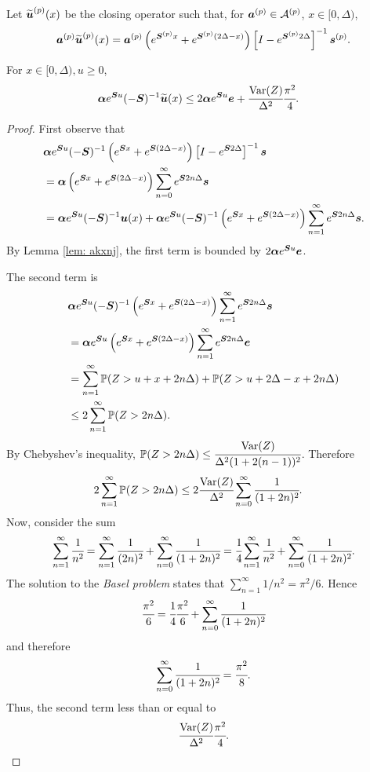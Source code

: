 Let \(\widetilde{\boldsymbol u}^{(p)}(x)\) be the closing operator such that, for \(\boldsymbol a^{(p)} \in\mathcal A^{(p)}\), \(x\in[0,\Delta)\),
\[\boldsymbol a^{(p)} \widetilde{\boldsymbol u}^{(p)}(x) = \boldsymbol a^{(p)} \left(e^{\boldsymbol{S}^{(p)}x} + e^{\boldsymbol{S}^{(p)}(2\Delta-x)}\right)\left[I-e^{\boldsymbol S^{(p)} 2\Delta}\right]^{-1}\boldsymbol s^{(p)}.\]
\begin{lem}\label{lem: akxnj2}
	For \(x\in[0,\Delta),u\geq 0\),  
        \begin{align*}
        		\boldsymbol \alpha   e^{\boldsymbol Su}(-\boldsymbol S)^{-1} \widetilde{\boldsymbol u}(x) &\leq 2 \boldsymbol \alpha e^{\boldsymbol Su} \boldsymbol e + \cfrac{\mathrm{Var}(Z)}{\Delta^2}\cfrac{\pi^2}{4}.
	\end{align*}
\end{lem}
\begin{proof}
	First observe that 
	\begin{align*}
		&\boldsymbol \alpha e^{\boldsymbol Su}(-\boldsymbol S)^{-1} \left(e^{\boldsymbol{S} x} + e^{\boldsymbol{S} (2\Delta-x)}\right)\left[I-e^{\boldsymbol S  2\Delta}\right]^{-1}\boldsymbol s 
		\\ &=\boldsymbol \alpha \left(e^{\boldsymbol{S} x} + e^{\boldsymbol{S} (2\Delta-x)}\right)\sum_{n=0}^\infty e^{\boldsymbol S  2n\Delta} \boldsymbol s 
		\\ &=\boldsymbol \alpha e^{\boldsymbol Su}(-\boldsymbol S)^{-1} \boldsymbol u(x) + \boldsymbol \alpha e^{\boldsymbol Su}(-\boldsymbol S)^{-1} \left(e^{\boldsymbol{S} x} + e^{\boldsymbol{S} (2\Delta-x)}\right)\sum_{n=1}^\infty e^{\boldsymbol S  2n\Delta} \boldsymbol s.
	\end{align*}
	By Lemma \ref{lem: akxnj}, the first term is bounded by \(2\boldsymbol \alpha e^{\boldsymbol S u}\boldsymbol e\). 
	
	The second term is 
	\begin{align*}
		&\boldsymbol \alpha e^{\boldsymbol Su}(-\boldsymbol S)^{-1} \left(e^{\boldsymbol{S} x} + e^{\boldsymbol{S} (2\Delta-x)}\right)\sum_{n=1}^\infty e^{\boldsymbol S  2n\Delta} \boldsymbol s
		\\&= \boldsymbol \alpha e^{\boldsymbol Su} \left(e^{\boldsymbol{S} x} + e^{\boldsymbol{S} (2\Delta-x)}\right)\sum_{n=1}^\infty e^{\boldsymbol S  2n\Delta} \boldsymbol e
		\\&=\sum_{n=1}^\infty \mathbb P(Z>u+x+2n\Delta) + \mathbb P(Z>u+2\Delta-x+2n\Delta)
		\\&\leq 2 \sum_{n=1}^\infty \mathbb P(Z>2n\Delta).
	\end{align*}
	By Chebyshev's inequality, \(\mathbb P(Z>2n\Delta)\leq \cfrac{\mathrm{Var}(Z)}{\Delta^2(1+2(n-1))^2}\). Therefore
	\begin{align}
		2 \sum_{n=1}^\infty \mathbb P(Z>2n\Delta)
		& \leq 2 \cfrac{\mathrm{Var}(Z)}{\Delta^2} \sum_{n=0}^\infty \cfrac{1}{(1+2n)^2}.
	\end{align}
	Now, consider the sum 
	\begin{align}
		\sum_{n=1}^\infty \cfrac{1}{n^2} = \sum_{n=1}^\infty \cfrac{1}{(2n)^2} + \sum_{n=0}^\infty \cfrac{1}{(1+2n)^2} = \cfrac{1}{4}\sum_{n=1}^\infty \cfrac{1}{n^2} + \sum_{n=0}^\infty \cfrac{1}{(1+2n)^2}.
	\end{align}
	The solution to the \emph{Basel problem} states that \(\displaystyle\sum_{n=1}^\infty 1/n^2=\pi^2/6.\) Hence 
	\[\cfrac{\pi^2}{6} = \cfrac{1}{4}\cfrac{\pi^2}{6} + \sum_{n=0}^\infty \cfrac{1}{(1+2n)^2}\]
	and therefore 
	\[\sum_{n=0}^\infty \cfrac{1}{(1+2n)^2} = \cfrac{\pi^2}{8}.\]
	Thus, the second term less than or equal to 
	\[\cfrac{\mathrm{Var}(Z)}{\Delta^2}\cfrac{\pi^2}{4}.\]
\end{proof}

